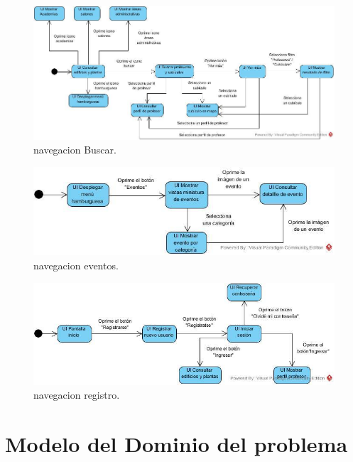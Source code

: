 \documentclass[oneside,10pt]{book}
\begin{document}
	\begin{figure}[htbp!]
		\centering
			\includegraphics[width=.5\textwidth]{mapa_nave/imagenesnav/buscar1}
		\caption{navegacion Buscar.}
	\end{figure}
	
	\begin{figure}[htbp!]
		\centering
			\includegraphics[width=.5\textwidth]{mapa_nave/imagenesnav/eventos}
		\caption{navegacion eventos.}
	\end{figure}
	
	\begin{figure}[htbp!]
		\centering
			\includegraphics[width=.5\textwidth]{mapa_nave/imagenesnav/registro}
		\caption{navegacion registro.}
	\end{figure}


\chapter{Modelo del Dominio del problema}
\end{document}
